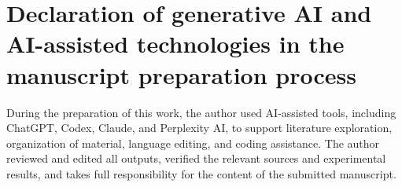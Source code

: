 \section*{Declaration of generative AI and AI-assisted technologies in the manuscript preparation process}
During the preparation of this work, the author used AI-assisted tools, including ChatGPT, Codex, Claude, and Perplexity AI, to support literature exploration, organization of material, language editing, and coding assistance. The author reviewed and edited all outputs, verified the relevant sources and experimental results, and takes full responsibility for the content of the submitted manuscript.
